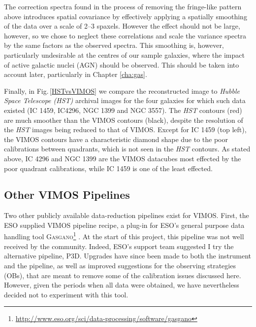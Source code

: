 		The correction spectra found in the process of removing the fringe-like pattern above introduces spatial covariance by effectively applying a spatially smoothing of the data over a scale of 2--3 spaxels. However the effect should not be large, however, so we chose to neglect these correlations and scale the variance spectra by the same factors as the observed spectra. This smoothing is, however, particularly undesirable at the centres of our sample galaxies, where the impact of active galactic nuclei (AGN) should be observed. This should be taken into account later, particularly in Chapter \ref{cha:gas}.

		Finally, in Fig.\,\ref{HSTvsVIMOS} we compare the reconstructed image to \textit{Hubble Space Telescope (HST)} archival images for the four galaxies for which such data existed (IC 1459, IC4296, NGC 1399 and NGC 3557). The \textit{HST} contours (red) are much smoother than the VIMOS contours (black), despite the resolution of the \textit{HST} images being reduced to that of VIMOS. Except for IC 1459 (top left), the VIMOS contours have a characteristic diamond shape due to the poor calibrations between quadrants, which is not seen in the \textit{HST} contours. As stated above, IC 4296 and NGC 1399 are the VIMOS datacubes most effected by the poor quadrant calibrations, while IC 1459 is one of the least effected.

		


	\subsection{Other VIMOS Pipelines}
		\label{subsec:Other}
		Two other publicly available data-reduction pipelines exist for VIMOS. First, the ESO supplied VIMOS pipeline recipe, a plug-in for ESO's general purpose data handling tool \textsc{Gasgano}\footnote{\url{http://www.eso.org/sci/data-processing/software/gasgano}} \citep{Izzo2004, ESO2012}. At the start of this project, this pipeline was not well received by the community. Indeed, ESO's support team suggested I try the alternative pipeline, \textsc{P3D}. Upgrades have since been made to both the instrument and the pipeline, as well as improved suggestions for the observing strategies (OBs), that are meant to remove some of the calibration issues discussed here. However, given the periods when all data were obtained, we have nevertheless decided not to experiment with this tool.
		
